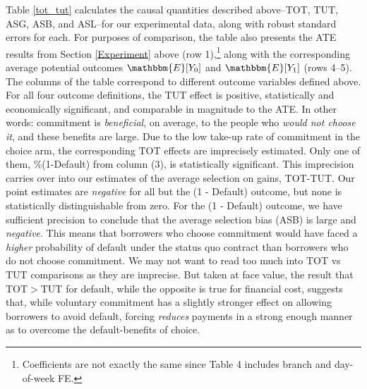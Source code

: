 \documentclass[12pt, a4paper]{article}
\begin{document}



Table \ref{tot_tut} calculates the causal quantities described above--TOT, TUT, ASG, ASB, and ASL--for our experimental data, along with robust standard errors for each. 
For purposes of comparison, the table also presents the ATE results from Section \ref{Experiment} above (row 1),\footnote{Coefficients are not exactly the same since Table 4 includes branch and day-of-week FE.} along with the corresponding average potential outcomes $\mathbbm{E}[Y_0]$ and $\mathbbm{E}[Y_1]$ (rows 4--5).
The columns of the table correspond to different outcome variables defined above.
For all four outcome definitions, the TUT effect is positive, statistically and economically significant, and comparable in magnitude to the ATE.
In other words: commitment is \emph{beneficial}, on average, to the people who \emph{would not choose it}, and these benefits are large.
Due to the low take-up rate of commitment in the choice arm, the corresponding TOT effects are imprecisely estimated. Only one of them, \%(1-Default) from column (3), is statistically significant. 
This imprecision carries over into our estimates of the average selection on gains, TOT-TUT. Our point estimates are \emph{negative} for all but the (1 - Default) outcome, but none is statistically distinguishable from zero.  
For the (1 - Default) outcome, we have sufficient precision to conclude that the average selection bias (ASB) is large and \emph{negative}.
This means that borrowers who choose commitment would have faced a \emph{higher} probability of default under the status quo contract than borrowers who do not choose commitment.  We may not want to read too much into TOT vs TUT comparisons as they are imprecise. But taken at face value, the result that TOT$>$TUT for default, while the opposite is true for financial cost, suggests that, while voluntary commitment has a slightly stronger effect on allowing borrowers to avoid default, forcing \textit{reduces} payments in a strong enough manner as to overcome the default-benefits of choice.  
\end{document}
